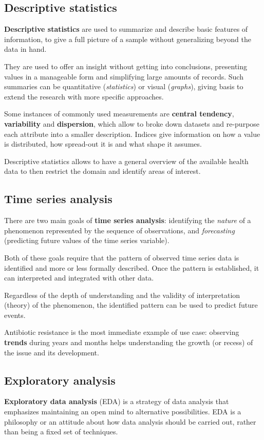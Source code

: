 \subsection{Descriptive statistics}
\textbf{Descriptive statistics} are used to summarize and describe basic features of information, to give a full picture of a sample without generalizing beyond the data in hand.

They are used to offer an insight without getting into conclusions, presenting values in a manageable form and simplifying large amounts of records. Such summaries can be quantitative (\textit{statistics}) or visual (\textit{graphs}), giving basis to extend the research with more specific approaches.

Some instances of commonly used measurements are \textbf{central tendency}, \textbf{variability} and \textbf{dispersion}, which allow to broke down datasets and re-purpose each attribute into a smaller description. Indices give information on how a value is distributed, how spread-out it is and what shape it assumes. 

Descriptive statistics allows to have a general overview of the available health data to then restrict the domain and identify areas of interest.

\subsection{Time series analysis}
There are two main goals of \textbf{time series analysis}: identifying the \textit{nature} of a phenomenon represented by the sequence of observations, and \textit{forecasting} (predicting future values of the time series variable). 

Both of these goals require that the pattern of observed time series data is identified and more or less formally described. Once the pattern is established, it can interpreted and integrated with other data. 

Regardless of the depth of understanding and the validity of interpretation (theory) of the phenomenon, the identified pattern can be used to predict future events\cite{timeseries}.

Antibiotic resistance is the most immediate example of use case: observing \textbf{trends} during years and months helps understanding the growth (or recess) of the issue and its development.

\subsection{Exploratory analysis}
\textbf{Exploratory data analysis} (EDA) is a strategy of data analysis that emphasizes maintaining an open mind to alternative possibilities. EDA is a philosophy or an attitude about how data analysis should be carried out, rather than being a fixed set of techniques\cite{yu}.

